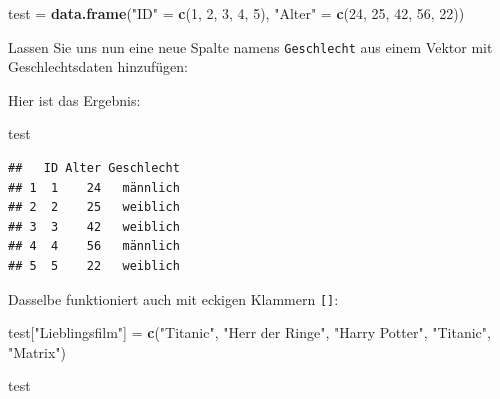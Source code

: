 \documentclass[
]{book}
\newenvironment{Shaded}{\begin{snugshade}}{\end{snugshade}}
\newcommand{\DecValTok}[1]{\textcolor[rgb]{0.00,0.00,0.81}{#1}}
\newcommand{\FunctionTok}[1]{\textcolor[rgb]{0.13,0.29,0.53}{\textbf{#1}}}
\newcommand{\NormalTok}[1]{#1}
\newcommand{\OtherTok}[1]{\textcolor[rgb]{0.56,0.35,0.01}{#1}}
\newcommand{\SpecialCharTok}[1]{\textcolor[rgb]{0.81,0.36,0.00}{\textbf{#1}}}
\newcommand{\StringTok}[1]{\textcolor[rgb]{0.31,0.60,0.02}{#1}}
\begin{document}
\begin{Shaded}
\begin{Highlighting}[]
\NormalTok{test }\OtherTok{=} \FunctionTok{data.frame}\NormalTok{(}\StringTok{"ID"} \OtherTok{=} \FunctionTok{c}\NormalTok{(}\DecValTok{1}\NormalTok{, }\DecValTok{2}\NormalTok{, }\DecValTok{3}\NormalTok{, }\DecValTok{4}\NormalTok{, }\DecValTok{5}\NormalTok{),}
                  \StringTok{"Alter"} \OtherTok{=} \FunctionTok{c}\NormalTok{(}\DecValTok{24}\NormalTok{, }\DecValTok{25}\NormalTok{, }\DecValTok{42}\NormalTok{, }\DecValTok{56}\NormalTok{, }\DecValTok{22}\NormalTok{))}
\end{Highlighting}
\end{Shaded}

Lassen Sie uns nun eine neue Spalte namens \texttt{Geschlecht} aus einem Vektor mit Geschlechtsdaten hinzufügen:

\begin{Shaded}
\end{Shaded}

Hier ist das Ergebnis:

\begin{Shaded}
\begin{Highlighting}[]
\NormalTok{test}
\end{Highlighting}
\end{Shaded}

\begin{verbatim}
##   ID Alter Geschlecht
## 1  1    24   männlich
## 2  2    25   weiblich
## 3  3    42   weiblich
## 4  4    56   männlich
## 5  5    22   weiblich
\end{verbatim}

Dasselbe funktioniert auch mit eckigen Klammern \texttt{{[}{]}}:

\begin{Shaded}
\begin{Highlighting}[]
\NormalTok{test[}\StringTok{"Lieblingsfilm"}\NormalTok{] }\OtherTok{=} \FunctionTok{c}\NormalTok{(}\StringTok{"Titanic"}\NormalTok{, }\StringTok{"Herr der Ringe"}\NormalTok{, }\StringTok{"Harry Potter"}\NormalTok{, }\StringTok{"Titanic"}\NormalTok{, }\StringTok{"Matrix"}\NormalTok{)}

\NormalTok{test}
\end{Highlighting}
\end{Shaded}
\end{document}
